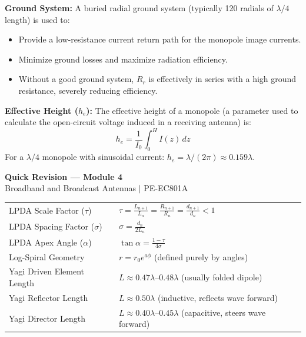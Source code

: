 \documentclass[12pt,a4paper]{article}
\renewcommand{\arraystretch}{1.45}
\begin{document}
\textbf{Ground System:} A buried radial ground system (typically 120 radials of $\lambda/4$ length) is used to:
\begin{itemize}[leftmargin=*, itemsep=2pt]
  \item Provide a low-resistance current return path for the monopole image currents.
  \item Minimize ground losses and maximize radiation efficiency.
  \item Without a good ground system, $R_r$ is effectively in series with a high ground resistance, severely reducing efficiency.
\end{itemize}

\textbf{Effective Height ($h_e$):} The effective height of a monopole (a parameter used to calculate the open-circuit voltage induced in a receiving antenna) is:
\[
h_e = \frac{1}{I_0} \int_0^H I(z)\,dz
\]
For a $\lambda/4$ monopole with sinusoidal current: $h_e = \lambda/(2\pi) \approx 0.159\lambda$.

\newpage
\begin{center}
  {\large\bfseries\color{myred} Quick Revision --- Module 4}\\[3pt]
  {\small\color{mydark} Broadband and Broadcast Antennas $|$ PE-EC801A}
\end{center}
\noindent{\color{myred}\rule{\linewidth}{1.2pt}}
\vspace{4pt}

\begin{tcolorbox}[formulabox, title={\textbf{Key Formulas and Metrics at a Glance}}]
\renewcommand{\arraystretch}{1.35}
\begin{tabularx}{\linewidth}{B{5.2cm} X}
LPDA Scale Factor ($\tau$) & $\tau = \frac{L_{n+1}}{L_n} = \frac{R_{n+1}}{R_n} = \frac{d_{n+1}}{d_n} < 1$ \\[4pt]
LPDA Spacing Factor ($\sigma$) & $\sigma = \frac{d_n}{2 L_n}$ \\[4pt]
LPDA Apex Angle ($\alpha$) & $\tan\alpha = \frac{1 - \tau}{4 \sigma}$ \\[4pt]
Log-Spiral Geometry & $r = r_0 e^{a\phi}$ \quad (defined purely by angles) \\[4pt]
Yagi Driven Element Length & $L \approx 0.47\lambda$–$0.48\lambda$ \quad (usually folded dipole) \\[4pt]
Yagi Reflector Length & $L \approx 0.50\lambda$ \quad (inductive, reflects wave forward) \\[4pt]
Yagi Director Length & $L \approx 0.40\lambda$–$0.45\lambda$ \quad (capacitive, steers wave forward) \\
\end{tabularx}
\end{tcolorbox}
\end{document}
